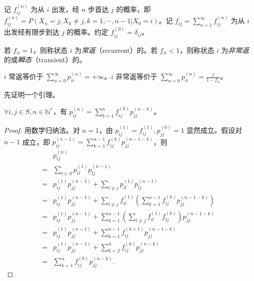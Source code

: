 \documentclass[../main.tex]{subfiles}
\begin{document}
\begin{definition}\label{def:7.3.3}
    记 $f_{ij}^{(n)}$ 为从 $i$ 出发，经 $n$ 步首达 $j$ 的概率，即 $f_{ij}^{(n)}=P(X_n=j,X_k\neq j,k=1,\cdots,n-1|X_0=i)$。记 $f_{ij}=\sum_{n=1}^\infty f_{ij}^{(n)}$ 为从 $i$ 出发经有限步到达 $j$ 的概率。约定 $f_{ij}^{(0)}=\delta_{ij}$。
\end{definition}

\begin{definition}\label{def:7.3.4}
    若 $f_{ii}=1$，则称状态 $i$ 为\emph{常返}（recurrent）的。若 $f_{ii}<1$，则称状态 $i$ 为\emph{非常返}的或\emph{瞬态}（transient）的。
\end{definition}

\begin{theorem}\label{thm:7.3.1}
    $i$ 常返等价于 $\sum_{n=0}^\infty p_{ii}^{(n)}=+\infty$。$i$ 非常返等价于 $\sum_{n=0}^\infty p_{ii}^{(n)}=\frac1{1-f_{ii}}$。
\end{theorem}

先证明一个引理。

\begin{lemma}
    $\forall i,j\in S,n\in\mathbb N^*$，有 $p_{ij}^{(n)}=\sum_{k=1}^nf_{ij}^{(k)}p_{jj}^{(n-k)}$。
\end{lemma}

\begin{proof}
    用数学归纳法。对 $n=1$，由 $p_{ij}^{(1)}=f_{ij}^{(1)},p_{jj}^{(0)}=1$ 显然成立。假设对 $n-1$ 成立，即 $p_{ij}^{(n-1)}=\sum_{k=1}^{n-1}f_{ij}^{(k)}p_{jj}^{(n-1-k)}$，则
    \begin{equation*}
        \begin{aligned}
              & p_{ij}^{(n)}                                                                                        \\
            = & \sum_{l\in S}p_{il}^{(1)}p_{lj}^{(n-1)}                                                             \\
            = & p_{ij}^{(1)}p_{jj}^{(n-1)}+\sum_{l\neq j}p_{il}^{(1)}p_{lj}^{(n-1)}                                 \\
            = & p_{ij}^{(1)}p_{jj}^{(n-1)}+\sum_{l\neq j}f_{il}^{(1)}(\sum_{k=1}^{n-1}f_{lj}^{(k)}p_{jj}^{(n-1-k)}) \\
            = & p_{ij}^{(1)}p_{jj}^{(n-1)}+\sum_{k=1}^{n-1}(\sum_{l\neq j}f_{il}^{(1)}f_{lj}^{(k)})p_{jj}^{(n-1-k)} \\
            = & p_{ij}^{(1)}p_{jj}^{(n-1)}+\sum_{k=1}^{n-1}f_{ij}^{(k+1)}p_{jj}^{(n-1-k)}                           \\
            = & p_{ij}^{(1)}p_{jj}^{(n-1)}+\sum_{k=2}^nf_{ij}^{(k)}p_{jj}^{(n-k)}                                   \\
            = & \sum_{k=1}^nf_{ij}^{(k)}p_{jj}^{(n-k)}.
        \end{aligned}
    \end{equation*}
\end{proof}
\end{document}
